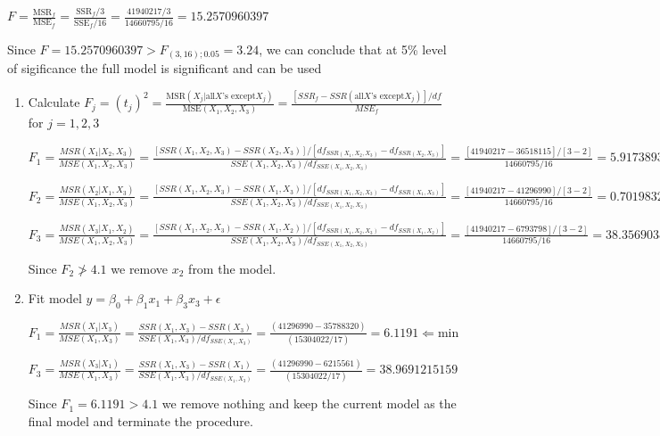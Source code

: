 \documentclass{article}
\begin{document}
\begin{enumerate}[1.]
\begin{enumerate}[(a)]
$F = \frac{\text{MSR}_f}{\text{MSE}_f} = \frac{\text{SSR}_f / 3}{\text{SSE}_f / 16} = \frac{ 41 940 217/3}{14 660 795/16} = 15.2570960397$

Since $F = 15.2570960397 > F_{(3, 16); 0.05} = 3.24$, we can conclude that at 5\% level of sigificance the full model is significant and can be used

\begin{enumerate}[(1)]

\item Calculate $F_j = (t_j)^2 = \frac{ \text{MSR}(X_j | \text{all} X \text{'s except} X_j) }{\text{MSE}(X_1, X_2, X_3)} = \frac{ [SSR_f - SSR(\text{all} X\text{'s except} X_j)]/df}{MSE_f}$ for $j = 1,2,3$

$F_1 =
\frac{ MSR(X_1 | X_2, X_3)
}{
MSE(X_1, X_2, X_3)
}
=
\frac{
[SSR(X_1, X_2, X_3) - SSR(X_2, X_3)]/[df_{SSR(X_1,X_2,X_3)} - df_{SSR(X_2,X_3)}]
}{
SSE(X_1, X_2, X_3)/df_{SSE(X_1, X_2, X_3)}
}
= 
\frac{
[41 940 217 - 36 518 115]/[3 - 2]
}{
14 660 795 / 16
}
= 5.91738933666
$

$F_2 =
\frac{ MSR(X_2 | X_1, X_3)
}{
MSE(X_1, X_2, X_3)
}
=
\frac{
[SSR(X_1, X_2, X_3) - SSR(X_1, X_3)]/[df_{SSR(X_1,X_2,X_3)} - df_{SSR(X_1,X_3)}]
}{
SSE(X_1, X_2, X_3)/df_{SSE(X_1, X_2, X_3)}
}
= 
\frac{
[41 940 217 - 41 296 990]/[3 - 2]
}{
14 660 795 / 16
}
= 0.701983214416 \Leftarrow \text{min}
$

$F_3 =
\frac{ MSR(X_3 | X_1, X_2)
}{
MSE(X_1, X_2, X_3)
}
=
\frac{
[SSR(X_1, X_2, X_3) - SSR(X_1, X_2)]/[df_{SSR(X_1,X_2,X_3)} - df_{SSR(X_1,X_2)}]
}{
SSE(X_1, X_2, X_3)/df_{SSE(X_1, X_2, X_3)}
}
= 
\frac{
[41 940 217 - 6 793 798]/[3 - 2]
}{
14 660 795 / 16
}
= 38.3569038378
$

Since $F_2 \ngtr 4.1$ we remove $x_2$ from the model.

\item Fit model $y = \beta_0 + \beta_1x_1 + \beta_3x_3 + \epsilon$

$F_1 =
\frac{ MSR(X_1 | X_3)
}{
MSE(X_1, X_3)
}
=
\frac{
SSR(X_1, X_3) - SSR(X_3)
}{
SSE(X_1,X_3)/df_{SSE(X_1, X_3)}
}
= 
\frac{
(41 296 990 - 35 788 320)
}{
(15 304 022 / 17)
}
= 6.1191 \Leftarrow \text{min}
$

$F_3 =
\frac{ MSR(X_3 | X_1)
}{
MSE(X_1, X_3)
}
=
\frac{
SSR(X_1, X_3) - SSR(X_1)
}{
SSE(X_1,  X_3)/df_{SSE(X_1, X_3)}
}
= 
\frac{
(41 296 990 - 6 215 561 )
}{
(15 304 022 / 17)
}
= 38.9691215159
$

Since $F_1 = 6.1191 > 4.1$ we remove nothing and keep the current model as the final model and terminate the procedure.


\end{enumerate}
\end{enumerate}
\end{enumerate}
\end{document}
